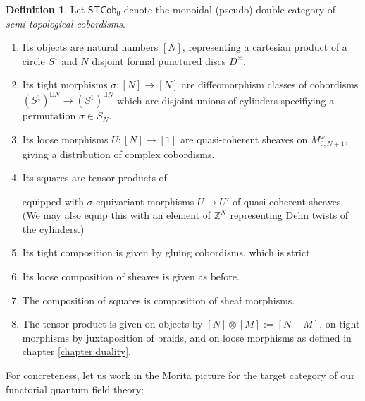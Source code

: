 \documentclass[11pt]{report}
\theoremstyle{definition}
\newtheorem{definition}[theorem]{Definition}
\theoremstyle{remark}
\theoremstyle{remark}
\newcommand{\id}{\textnormal{id}}
\newcommand{\Z}{\mathbb{Z}}
\begin{document}
\begin{definition}
Let $\mathsf{STCob}_0$ denote the monoidal (pseudo) double category of \emph{semi-topological cobordisms}.
\begin{enumerate}[label=(\roman*)]
\item Its objects are natural numbers $[N]$, representing a cartesian product of a circle $S^1$ and $N$ disjoint formal punctured discs $D^\times$.
\item Its tight morphisms $\sigma: [N] \to [N]$ are diffeomorphism classes of cobordisms $(S^1)^{\sqcup N} \to (S^1)^{\sqcup N}$ which are disjoint unions of cylinders specifiying a permutation $\sigma \in S_N$.
\item Its loose morphisms $U: [N] \to [1]$ are quasi-coherent sheaves on $M_{0,N+1}^\omega$, giving a distribution of complex cobordisms.
\item Its squares are tensor products of
\begin{center}
\end{center}
equipped with $\sigma$-equivariant morphisms $U \to U'$ of quasi-coherent sheaves. (We may also equip this with an element of $\Z^N$ representing Dehn twists of the cylinders.)
\item Its tight composition is given by gluing cobordisms, which is strict.
\item Its loose composition of sheaves is given as before.
\item The composition of squares is composition of sheaf morphisms.
\item The tensor product is given on objects by $[N] \otimes [M] := [N+M]$, on tight morphisms by juxtaposition of braids, and on loose morphisms as defined in chapter \ref{chapter:duality}.
\end{enumerate}
\end{definition}

For concreteness, let us work in the Morita picture for the target category of our functorial quantum field theory:
\end{document}
